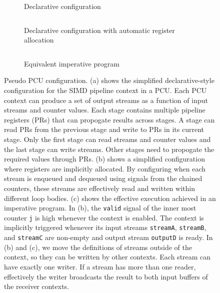 \begin{figure}
  \begin{subfigure}[b]{0.5\textwidth}
    \inputminted{python}{code/contextfull.py}
    \caption{Declarative configuration}
    \label{fig:contexta}
  \end{subfigure}
  \hfill
  \begin{subfigure}[b]{0.4\textwidth}
    \inputminted{python}{code/context_dec_simple.py}
    \caption{Declarative configuration with automatic register allocation}
    \label{fig:contextb}
    \inputminted{python}{code/context_imp.py}
    \caption{Equivalent imperative program}
    \label{fig:contextc}
  \end{subfigure}
  \caption[Example PCU configuration]{
    Pseudo PCU configuration.
    (a) shows the simplified declarative-style configuration for the SIMD pipeline context in a PCU.
    Each PCU context can produce a set of output streams as a function of input streams and counter
    values.
    Each stage contains multiple pipeline registers (PRs) that can propogate results across stages.
    A stage can read PRs from the previous stage and write to PRs in its current stage.
    Only the first stage can read streams and counter values and the last stage can write streams. 
    Other stages need to propogate the required values through PRs.
    (b) shows a simplified configuration where registers are implicitly allocated.
    By configuring when each stream is enqueued and dequeued using signals from the chained counters, 
    these streams are effectively read and written within different loop bodies.
    (c) shows the effective execution achieved in an imperative program.
    In (b), the \texttt{valid} signal of the inner most counter \texttt{j} is high whenever the context is
    enabled. The context is implicitly triggered whenever its input streams \texttt{streamA},
    \texttt{streamB}, and \texttt{streamC} are non-empty and output stream \texttt{outputD} is ready.
    In (b) and (c), we move the definitions of streams outside of the context, so they can be written by
    other contexts. 
    Each stream can have exactly one writer. 
    If a stream has more than one reader, effectively the
    writer broadcasts the result to both input buffers of the receiver contexts.
  }
  \label{fig:context}
\end{figure}

